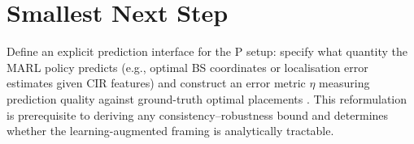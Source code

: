 \documentclass{article}
\begin{document}
\section*{Smallest Next Step}

Define an explicit prediction interface for the P setup: specify what quantity the MARL policy predicts (e.g., optimal BS coordinates or localisation error estimates given CIR features) and construct an error metric \(\eta\) measuring prediction quality against ground-truth optimal placements . This reformulation is prerequisite to deriving any consistency--robustness bound and determines whether the learning-augmented framing is analytically tractable.
\end{document}

